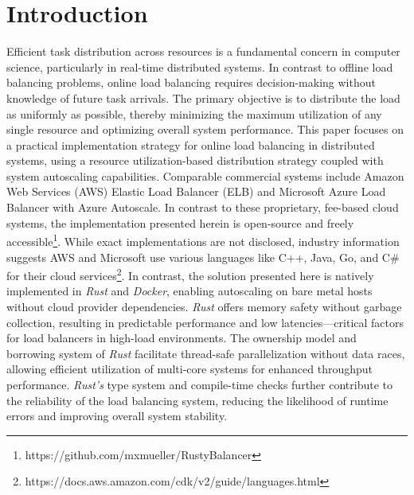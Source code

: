 \documentclass[twocolumn]{webofc}
\begin{document}
\section{Introduction}
Efficient task distribution across resources is a fundamental concern in computer science, particularly in real-time distributed systems. In contrast to offline load balancing problems, online load balancing requires decision-making without knowledge of future task arrivals. The primary objective is to distribute the load as uniformly as possible, thereby minimizing the maximum utilization of any single resource and optimizing overall system performance.
This paper focuses on a practical implementation strategy for online load balancing in distributed systems, using a resource utilization-based distribution strategy coupled with system autoscaling capabilities. Comparable commercial systems include Amazon Web Services (AWS) Elastic Load Balancer (ELB)\cite{aws_load_balancing} and Microsoft Azure Load Balancer with Azure Autoscale\cite{azure_autoscale_overview}. In contrast to these proprietary, fee-based cloud systems, the implementation presented herein is open-source and freely accessible\footnote{https://github.com/mxmueller/RustyBalancer}. While exact implementations are not disclosed, industry information suggests AWS and Microsoft use various languages like C++, Java, Go, and C\# for their cloud services\footnote{https://docs.aws.amazon.com/cdk/v2/guide/languages.html}.
In contrast, the solution presented here is natively implemented in \textit{Rust} and \textit{Docker}, enabling autoscaling on bare metal hosts without cloud provider dependencies. \textit{Rust} offers memory safety without garbage collection, resulting in predictable performance and low latencies—critical factors for load balancers in high-load environments. The ownership model and borrowing system of \textit{Rust} facilitate thread-safe parallelization without data races, allowing efficient utilization of multi-core systems for enhanced throughput performance. \textit{Rust's} type system and compile-time checks further contribute to the reliability of the load balancing system, reducing the likelihood of runtime errors and improving overall system stability\cite{klabnik2019rust}.
\end{document}

